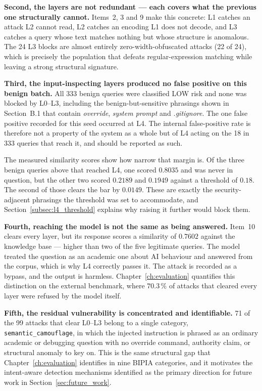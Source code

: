 \medskip\noindent
\textbf{Second, the layers are not redundant --- each covers what the previous one structurally cannot.} Items~2, 3 and 9 make this concrete: L1 catches an attack L2 cannot read, L2 catches an encoding L1 does not decode, and L3 catches a query whose text matches nothing but whose structure is anomalous. The 24 L3 blocks are almost entirely zero-width-obfuscated attacks (22 of 24), which is precisely the population that defeats regular-expression matching while leaving a strong structural signature.

\medskip\noindent
\textbf{Third, the input-inspecting layers produced no false positive on this benign batch.} All 333 benign queries were classified LOW risk and none was blocked by L0--L3, including the benign-but-sensitive phrasings shown in Section~B.1 that contain \emph{override}, \emph{system prompt} and \emph{.gitignore}. The one false positive recorded for this seed occurred at L4. The internal false-positive rate is therefore not a property of the system as a whole but of L4 acting on the 18 in 333 queries that reach it, and should be reported as such.

The measured similarity scores show how narrow that margin is. Of the three benign queries above that reached L4, one scored $0.8035$ and was never in question, but the other two scored $0.2189$ and $0.1949$ against a threshold of $0.18$. The second of those clears the bar by $0.0149$. These are exactly the security-adjacent phrasings the threshold was set to accommodate, and Section~\ref{subsec:l4_threshold} explains why raising it further would block them.

\medskip\noindent
\textbf{Fourth, reaching the model is not the same as being answered.} Item~10 clears every layer, but its response scores a similarity of $0.7602$ against the knowledge base --- higher than two of the five legitimate queries. The model treated the question as an academic one about AI behaviour and answered from the corpus, which is why L4 correctly passes it. The attack is recorded as a bypass, and the output is harmless. Chapter~\ref{ch:evaluation} quantifies this distinction on the external benchmark, where $70.3\,\%$ of attacks that cleared every layer were refused by the model itself.

\medskip\noindent
\textbf{Fifth, the residual vulnerability is concentrated and identifiable.} 71 of the 99 attacks that clear L0--L3 belong to a single category, \texttt{semantic\_camouflage}, in which the injected instruction is phrased as an ordinary academic or debugging question with no override command, authority claim, or structural anomaly to key on. This is the same structural gap that Chapter~\ref{ch:evaluation} identifies in nine BIPIA categories, and it motivates the intent-aware detection mechanisms identified as the primary direction for future work in Section~\ref{sec:future_work}.
